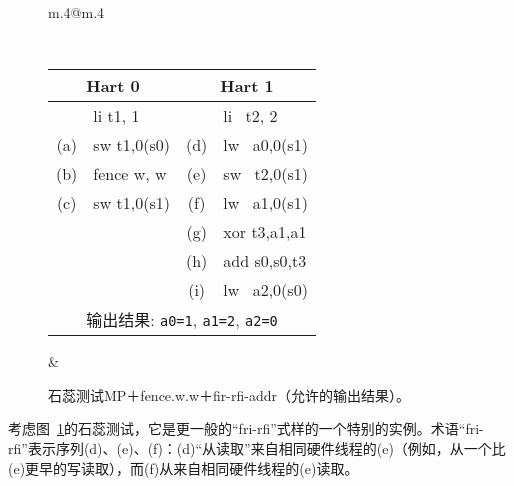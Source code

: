 \begin{figure}[h!]
  \center
  \begin{tabular}{m{.4\linewidth}@{\qquad}m{.4\linewidth}}
    {\tt\small
    \begin{tabular}{cl||cl}
    \multicolumn{2}{c}{Hart 0} & \multicolumn{2}{c}{Hart 1} \\
    \hline
          & li t1, 1    &     & li~ t2, 2    \\
      (a) & sw t1,0(s0) & (d) & lw~ a0,0(s1) \\
      (b) & fence w, w  & (e) & sw~ t2,0(s1) \\
      (c) & sw t1,0(s1) & (f) & lw~ a1,0(s1) \\
          &             & (g) & xor t3,a1,a1 \\
          &             & (h) & add s0,s0,t3 \\
          &             & (i) & lw~ a2,0(s0) \\
      \hline
      \multicolumn{4}{c}{输出结果: {\tt a0=1}, {\tt a1=2}, {\tt a2=0}}
    \end{tabular}
  }
  &
  
  \end{tabular}
  \caption{石蕊测试MP＋fence.w.w＋fir-rfi-addr（允许的输出结果）。 
  }
  \label{fig:litmus:frirfi}
\end{figure}

考虑图~\ref{fig:litmus:frirfi}的石蕊测试，它是更一般的“fri-rfi”式样的一个特别的实例。术语“fri-rfi”表示序列(d)、(e)、(f)：(d)“从读取”来自相同硬件线程的(e)（例如，从一个比(e)更早的写读取），而(f)从来自相同硬件线程的(e)读取。


